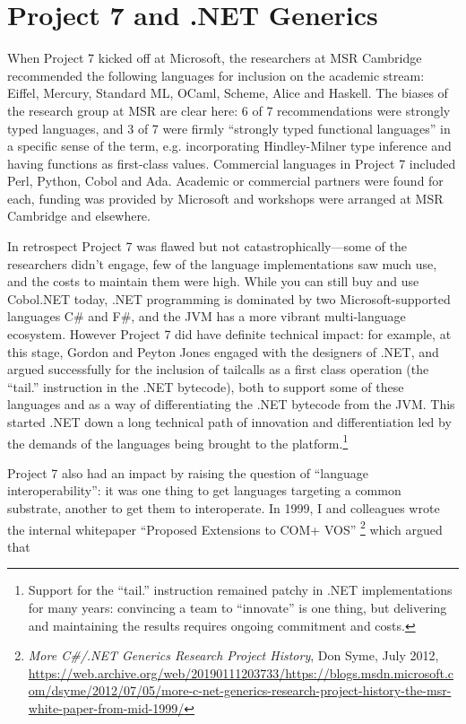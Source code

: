 \documentclass[acmsmall]{acmart}\settopmatter{}
\begin{document}
\section*{Project 7 and .NET Generics}

When Project 7 kicked off at Microsoft, the researchers at MSR Cambridge recommended the following languages for inclusion on the academic
stream: Eiffel, Mercury, Standard ML, OCaml, Scheme, Alice and Haskell.  The biases of the research group at MSR are clear here: 6 of 7 recommendations
were strongly typed languages, and 3 of 7 were firmly “strongly typed functional languages” in a specific sense of the term, e.g. incorporating Hindley-Milner
type inference and having functions as first-class values. Commercial languages in Project 7 included Perl, Python, Cobol and Ada. Academic or commercial
partners were found for each, funding was provided by Microsoft and workshops were arranged at MSR Cambridge and elsewhere.

In retrospect Project 7 was flawed but not catastrophically---some of the researchers didn’t engage, few of the language implementations saw much use, and
the costs to maintain them were high. While you can still buy and use Cobol.NET today, .NET programming is dominated by two Microsoft-supported
languages C\# and F\#, and the JVM has a more vibrant multi-language ecosystem. However Project 7 did have definite technical impact: for example, at
this stage, Gordon and Peyton Jones engaged with the designers of .NET, and argued successfully for the inclusion of tailcalls as a first class
operation (the “tail.” instruction in the .NET bytecode), both to support some of these languages and as a way of differentiating the .NET bytecode from the JVM.  This
started .NET down a long technical path of innovation and differentiation led by the demands of the languages being brought to the
platform.\footnote{ Support for the “tail.” instruction remained patchy in .NET implementations for many years: convincing a team to ``innovate'' is one
thing, but delivering and maintaining the results requires ongoing commitment and costs.}

Project 7 also had an impact by raising the question of “language interoperability”: it was one thing to get languages targeting a common
substrate, another to get them to interoperate.  In 1999, I and colleagues wrote the internal whitepaper “Proposed Extensions
to COM+ VOS” \footnote{ \textit{More C\#/.NET Generics Research Project History}, Don Syme, July 2012,  \url{https://web.archive.org/web/20190111203733/https://blogs.msdn.microsoft.com/dsyme/2012/07/05/more-c-net-generics-research-project-history-the-msr-white-paper-from-mid-1999/} } which argued that 
\end{document}
